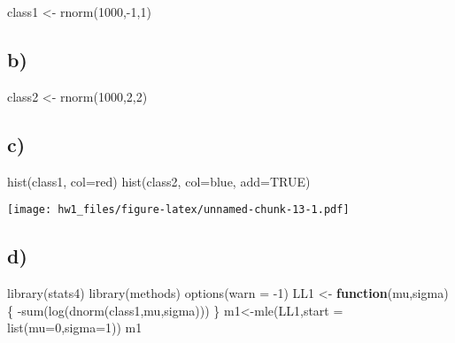 \documentclass[
]{article}
\newenvironment{Shaded}{\begin{snugshade}}{\end{snugshade}}
\newcommand{\AttributeTok}[1]{\textcolor[rgb]{0.77,0.63,0.00}{#1}}
\newcommand{\ConstantTok}[1]{\textcolor[rgb]{0.00,0.00,0.00}{#1}}
\newcommand{\ControlFlowTok}[1]{\textcolor[rgb]{0.13,0.29,0.53}{\textbf{#1}}}
\newcommand{\DecValTok}[1]{\textcolor[rgb]{0.00,0.00,0.81}{#1}}
\newcommand{\FunctionTok}[1]{\textcolor[rgb]{0.00,0.00,0.00}{#1}}
\newcommand{\NormalTok}[1]{#1}
\newcommand{\OtherTok}[1]{\textcolor[rgb]{0.56,0.35,0.01}{#1}}
\newcommand{\SpecialCharTok}[1]{\textcolor[rgb]{0.00,0.00,0.00}{#1}}
\newcommand{\StringTok}[1]{\textcolor[rgb]{0.31,0.60,0.02}{#1}}
\begin{document}
\begin{Shaded}
\begin{Highlighting}[]
\NormalTok{class1 }\OtherTok{\textless{}{-}} \FunctionTok{rnorm}\NormalTok{(}\DecValTok{1000}\NormalTok{,}\SpecialCharTok{{-}}\DecValTok{1}\NormalTok{,}\DecValTok{1}\NormalTok{)}
\end{Highlighting}
\end{Shaded}

\hypertarget{b-1}{%
\subsection{b)}\label{b-1}}

\begin{Shaded}
\begin{Highlighting}[]
\NormalTok{class2 }\OtherTok{\textless{}{-}} \FunctionTok{rnorm}\NormalTok{(}\DecValTok{1000}\NormalTok{,}\DecValTok{2}\NormalTok{,}\DecValTok{2}\NormalTok{)}
\end{Highlighting}
\end{Shaded}

\hypertarget{c-1}{%
\subsection{c)}\label{c-1}}

\begin{Shaded}
\begin{Highlighting}[]
\FunctionTok{hist}\NormalTok{(class1, }\AttributeTok{col=}\StringTok{\textquotesingle{}red\textquotesingle{}}\NormalTok{)}
\FunctionTok{hist}\NormalTok{(class2, }\AttributeTok{col=}\StringTok{\textquotesingle{}blue\textquotesingle{}}\NormalTok{, }\AttributeTok{add=}\ConstantTok{TRUE}\NormalTok{)}
\end{Highlighting}
\end{Shaded}

\texttt{[image: hw1\_files/figure-latex/unnamed-chunk-13-1.pdf]}

\hypertarget{d-1}{%
\subsection{d)}\label{d-1}}

\begin{Shaded}
\begin{Highlighting}[]
\FunctionTok{library}\NormalTok{(stats4)}
\FunctionTok{library}\NormalTok{(methods)}
\FunctionTok{options}\NormalTok{(}\AttributeTok{warn =} \SpecialCharTok{{-}}\DecValTok{1}\NormalTok{)}
\NormalTok{LL1 }\OtherTok{\textless{}{-}} \ControlFlowTok{function}\NormalTok{(mu,sigma)\{}
  \SpecialCharTok{{-}}\FunctionTok{sum}\NormalTok{(}\FunctionTok{log}\NormalTok{(}\FunctionTok{dnorm}\NormalTok{(class1,mu,sigma)))}
\NormalTok{\}}
\NormalTok{m1}\OtherTok{\textless{}{-}}\FunctionTok{mle}\NormalTok{(LL1,}\AttributeTok{start =} \FunctionTok{list}\NormalTok{(}\AttributeTok{mu=}\DecValTok{0}\NormalTok{,}\AttributeTok{sigma=}\DecValTok{1}\NormalTok{))}
\NormalTok{m1}
\end{Highlighting}
\end{Shaded}
\end{document}
